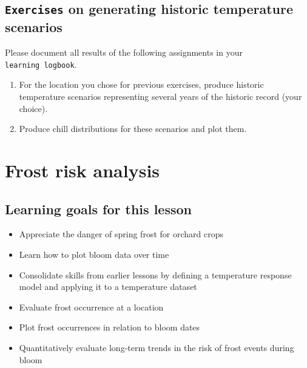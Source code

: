 \documentclass[
]{book}
\providecommand{\tightlist}{%
  \setlength{\itemsep}{0pt}\setlength{\parskip}{0pt}}
\begin{document}
\hypertarget{exercises_historic_scenarios}{%
\section*{\texorpdfstring{\texttt{Exercises} on generating historic temperature scenarios}{Exercises on generating historic temperature scenarios}}\label{exercises_historic_scenarios}}

Please document all results of the following assignments in your \texttt{learning\ logbook}.

\begin{enumerate}
\def\labelenumi{\arabic{enumi})}
\tightlist
\item
  For the location you chose for previous exercises, produce historic temperature scenarios representing several years of the historic record (your choice).
\item
  Produce chill distributions for these scenarios and plot them.
\end{enumerate}

\hypertarget{frost-risk-analysis}{%
\chapter{Frost risk analysis}\label{frost-risk-analysis}}

\hypertarget{goals_frost_risk}{%
\section*{Learning goals for this lesson}\label{goals_frost_risk}}

\begin{itemize}
\tightlist
\item
  Appreciate the danger of spring frost for orchard crops
\item
  Learn how to plot bloom data over time
\item
  Consolidate skills from earlier lessons by defining a temperature response model and applying it to a temperature dataset
\item
  Evaluate frost occurrence at a location
\item
  Plot frost occurrences in relation to bloom dates
\item
  Quantitatively evaluate long-term trends in the risk of frost events during bloom
\end{itemize}
\end{document}

